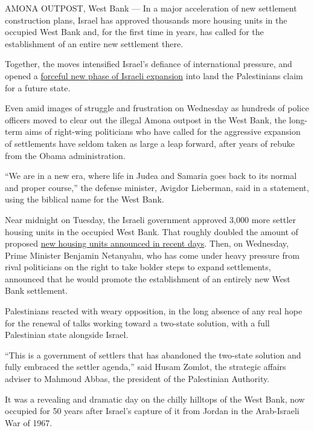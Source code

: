 AMONA OUTPOST, West Bank --- In a major acceleration of new settlement
construction plans, Israel has approved thousands more housing units in
the occupied West Bank and, for the first time in years, has called for
the establishment of an entire new settlement there.

Together, the moves intensified Israel's defiance of international
pressure, and opened a
\href{https://www.nytimes3xbfgragh.onion/2017/01/24/world/middleeast/israel-settlement-expansion-west-bank.html}{forceful
new phase of Israeli expansion} into land the Palestinians claim for a
future state.

Even amid images of struggle and frustration on Wednesday as hundreds of
police officers moved to clear out the illegal Amona outpost in the West
Bank, the long-term aims of right-wing politicians who have called for
the aggressive expansion of settlements have seldom taken as large a
leap forward, after years of rebuke from the Obama administration.

``We are in a new era, where life in Judea and Samaria goes back to its
normal and proper course,'' the defense minister, Avigdor Lieberman,
said in a statement, using the biblical name for the West Bank.

Near midnight on Tuesday, the Israeli government approved 3,000 more
settler housing units in the occupied West Bank. That roughly doubled
the amount of proposed
\href{https://www.nytimes3xbfgragh.onion/2017/01/24/world/middleeast/israel-settlement-expansion-west-bank.html}{new
housing units announced in recent days}. Then, on Wednesday, Prime
Minister Benjamin Netanyahu, who has come under heavy pressure from
rival politicians on the right to take bolder steps to expand
settlements, announced that he would promote the establishment of an
entirely new West Bank settlement.

Palestinians reacted with weary opposition, in the long absence of any
real hope for the renewal of talks working toward a two-state solution,
with a full Palestinian state alongside Israel.

``This is a government of settlers that has abandoned the two-state
solution and fully embraced the settler agenda,'' said Husam Zomlot, the
strategic affairs adviser to Mahmoud Abbas, the president of the
Palestinian Authority.

It was a revealing and dramatic day on the chilly hilltops of the West
Bank, now occupied for 50 years after Israel's capture of it from Jordan
in the Arab-Israeli War of 1967.


